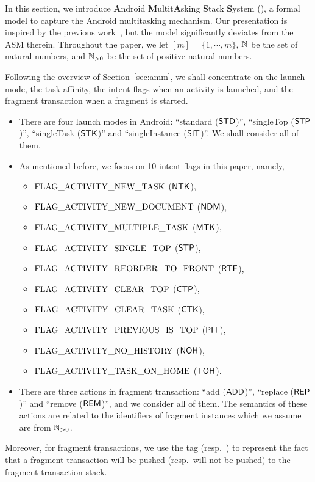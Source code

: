 
In this section, we introduce \textbf{A}ndroid \textbf{M}ultit\textbf{A}sking \textbf{S}tack \textbf{S}ystem (\AMASS), a formal model to capture the Android multitasking mechanism. Our presentation is inspired by the previous work~\cite{ChenHSWWY18,HCWWY19}, but the model significantly deviates from the ASM therein. Throughout the paper, we let $[m]=\{1, \cdots, m\}$, ${\mathbb{N} }$ be the set of natural numbers, and ${\mathbb{N}_{> 0} }$ be the set of positive natural numbers. 

Following the overview of Section~\ref{sec:amm}, we shall concentrate on the launch mode, the task affinity, the intent flags when an activity is launched, and the fragment transaction when a fragment is started.  
\begin{itemize}
\item There are four launch modes in Android: ``standard (${\sf STD}$)'', ``singleTop (${\sf STP}$)'', ``singleTask (${\sf STK}$)'' and ``singleInstance (${\sf SIT}$)''.  We shall consider all of them. 
%
\item As mentioned before, we focus on 10 intent flags in this paper, namely, 
\begin{itemize}
\item $\rm FLAG\_ACTIVITY\_NEW\_TASK$ (${\sf NTK}$),
\item $\rm FLAG\_ACTIVITY\_NEW\_DOCUMENT$ (${\sf NDM}$),
\item $\rm FLAG\_ACTIVITY\_MULTIPLE\_TASK$ (${\sf MTK}$),
\item $\rm FLAG\_ACTIVITY\_SINGLE\_TOP$ (${\sf STP}$),
\item $\rm FLAG\_ACTIVITY\_REORDER\_TO\_FRONT$ (${\sf RTF}$),
\item $\rm FLAG\_ACTIVITY\_CLEAR\_TOP$ (${\sf CTP}$),
\item $\rm FLAG\_ACTIVITY\_CLEAR\_TASK$ (${\sf CTK}$),
\item $\rm FLAG\_ACTIVITY\_PREVIOUS\_IS\_TOP$ (${\sf PIT}$),
\item $\rm FLAG\_ACTIVITY\_NO\_HISTORY$ (${\sf NOH}$),
\item $\rm FLAG\_ACTIVITY\_TASK\_ON\_HOME$ (${\sf TOH}$).	
\end{itemize}

\item There are three actions in fragment transaction: ``add ($\mathsf{ADD}$)'', ``replace ($\mathsf{REP}$)'' and ``remove ($\mathsf{REM}$)'', and we consider all of them. 
The semantics of these actions are related to the identifiers of fragment instances which we assume are from ${\mathbb{N}_{> 0} }$. 
\end{itemize}
Moreover, for fragment transactions, we use the tag {\opstack} (resp.\ {\nopstack}) to represent the fact that a fragment transaction will be pushed (resp.\ will not be pushed) to the fragment transaction stack. 

